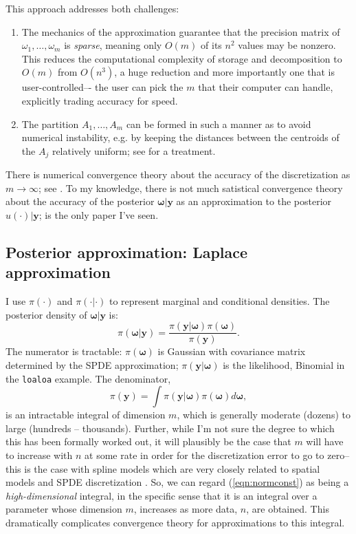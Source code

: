 \documentclass[12pt]{article}
\newcommand{\mb}[1]{\boldsymbol{#1}}
\newcommand{\response}{\mb{y}}
\begin{document}
This approach addresses both challenges:
\begin{enumerate}
  \item The mechanics of the approximation guarantee that the precision matrix of $\omega_1,\ldots,\omega_m$ is \emph{sparse}, meaning only $O(m)$ of its $n^2$ values may be nonzero.
  This reduces the computational complexity of storage and decomposition to $O(m)$ from $O(n^3)$, a huge reduction and more importantly one that is user-controlled–- the user can pick the $m$ that their computer can handle, explicitly trading accuracy for speed.
  \item The partition $A_1,\ldots,A_m$ can be formed in such a manner as to avoid numerical instability, e.g. by keeping the distances between the centroids of the $A_j$ relatively uniform; see \citet{simpson2016going} for a treatment.
\end{enumerate}

There is numerical convergence theory about the accuracy of the discretization as $m\to\infty$; see \citet{spde}.
To my knowledge, there is not much satistical convergence theory about the accuracy of the posterior $\mb{\omega}|\response$
as an approximation to the posterior $u(\cdot)|\response$; \citet{sanz2022finite} is the only paper I've seen.

\subsection{Posterior approximation: Laplace approximation}\label{subsec:laplace}

I use $\pi(\cdot)$ and $\pi(\cdot|\cdot)$ to represent marginal and conditional densities.
The posterior density of $\mb{\omega}|\response$ is:
\begin{equation}\label{eqn:posterior}
\pi(\mb{\omega}|\response) = \frac{\pi(\response|\mb{\omega})\pi(\mb{\omega})}{\pi(\response)}.
\end{equation}
The numerator is tractable: $\pi(\mb{\omega})$ is Gaussian with covariance matrix determined by the SPDE approximation;
$\pi(\response|\mb{\omega})$ is the likelihood, Binomial in the \texttt{loaloa} example.
The denominator,
\begin{equation}\label{eqn:normconst}
\pi(\response) = \int\pi(\response|\mb{\omega})\pi(\mb{\omega})d\mb{\omega},
\end{equation}
is an intractable integral of dimension $m$, which is generally moderate (dozens) to large (hundreds -- thousands).
Further, while I'm not sure the degree to which this has been formally worked out, it will plausibly be the case 
that $m$ will have to increase with $n$ at some rate in order for the discretization error to go to zero-- this is the
case with spline models \citep{kauermann2009some} which are very closely related to spatial models and SPDE discretization \citep{miller2020understanding}. So, we can regard (\ref{eqn:normconst}) as being a \emph{high-dimensional} integral, in the specific sense
that it is an integral over a parameter whose dimension $m$, increases as more data, $n$, are obtained. This dramatically
complicates convergence theory for approximations to this integral.
\end{document}
